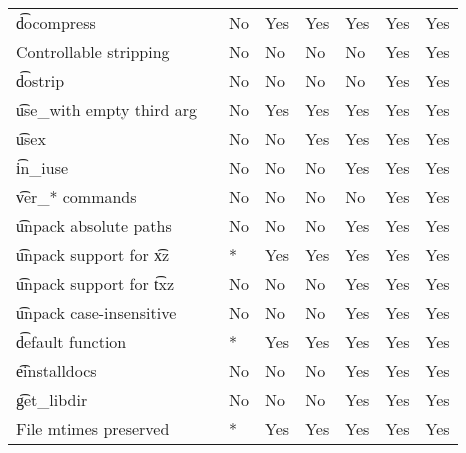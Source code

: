 \begin{landscape}
\begin{longtable}{llP{7.5em}P{7.5em}P{7.5em}P{7.5em}P{7.5em}P{7.5em}}
\t{docompress} &  &
    No & Yes & Yes & Yes & Yes & Yes \\

Controllable stripping &  &
    No & No & No & No & Yes & Yes \\

\t{dostrip} &  &
    No & No & No & No & Yes & Yes \\

\t{use_with} empty third arg &  &
    No & Yes & Yes & Yes & Yes & Yes \\

\t{usex} &  &
    No & No & Yes & Yes & Yes & Yes \\

\t{in_iuse} &  &
    No & No & No & Yes & Yes & Yes \\

\t{ver_*} commands &  &
    No & No & No & No & Yes & Yes \\

\t{unpack} absolute paths &  &
    No & No & No & Yes & Yes & Yes \\

\t{unpack} support for \t{xz} &  &
    * & Yes & Yes & Yes & Yes & Yes \\

\t{unpack} support for \t{txz} &  &
    No & No & No & Yes & Yes & Yes \\

\t{unpack} case-insensitive &  &
    No & No & No & Yes & Yes & Yes \\

\t{default} function &  &
    * & Yes & Yes & Yes & Yes & Yes \\

\t{einstalldocs} &  &
    No & No & No & Yes & Yes & Yes \\

\t{get_libdir} &  &
    No & No & No & Yes & Yes & Yes \\

File mtimes preserved &  &
    * & Yes & Yes & Yes & Yes & Yes \\

\end{longtable}
\end{landscape}

